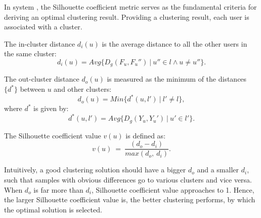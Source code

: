 In system \sys{}, the Silhouette coefficient metric serves as the fundamental criteria for deriving an optimal clustering result.
Providing a clustering result, each user is associated with a cluster.


\begin{definition}
\label{def:di}
The in-cluster distance $d_i(u)$ is the average distance to all the other users in the same cluster:
\begin{equation}
	d_i(u) = Avg\{D_g(F_u, F_u'')\ |\ u'' \in l \wedge  u \neq u''\}.
\end{equation}
\end{definition}

\begin{definition}
\label{def:do}
The out-cluster distance $d_o(u)$ is measured as the minimum of the distances $\{d^{\ast}\}$ between $u$ and other clusters:
\begin{equation}
	d_o(u) = Min\{d^{\ast}(u, l')\ |\  l' \neq l \},
\end{equation}
where $d^{\ast}$ is given by:
\begin{equation}
	d^{\ast}(u, l') = Avg\{D_g(Y_u, Y_u') \ | \ u' \in l'\}.
\end{equation}
\end{definition}

\begin{definition}
\label{def:coef}
The Silhouette coefficient value $v(u)$ is defined as:
\begin{equation}
\label{eq:coef}
v(u)\ =\ \frac{(d_o - d_i)}{max(d_o,\ d_i)}.	
\end{equation}
\end{definition}

Intuitively, a good clustering solution should have a bigger $d_o$ and a smaller $d_i$, such that samples with obvious differences go to various clusters and vice versa.
When $d_o$ is far more than $d_i$, Silhouette coefficient value approaches to 1.
Hence, the larger Silhouette coefficient value is, the better clustering performs, by which the optimal solution is selected.





